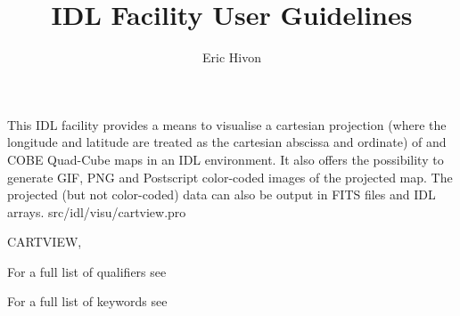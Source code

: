 




\sloppy



\title{\healpix IDL Facility User Guidelines}
 \section[cartview]{ }
\label{idl:\thedocid}
\author{Eric Hivon}



\begin{facility}
{This IDL facility provides a means to visualise a cartesian projection 
(where the longitude and latitude are treated as the cartesian abscissa and
ordinate) of
\healpix and COBE Quad-Cube maps in an IDL environment. 
It also offers the possibility to
generate GIF, PNG and Postscript color-coded images of the projected map.
The projected (but not color-coded) data can also be output in FITS files and
IDL arrays.}
{src/idl/visu/cartview.pro}
\end{facility}

\begin{IDLformat}
{CARTVIEW, 
\normalsize{
}
}
\end{IDLformat}

\begin{qualifiers}
  \begin{qulist}{} %
\item [{\  }] For a full list of qualifiers see 
  \end{qulist}
\end{qualifiers}

\begin{keywords}
  \begin{kwlist}{} %
\item [{\  }] For a full list of keywords see 
  \end{kwlist}
\end{keywords}


